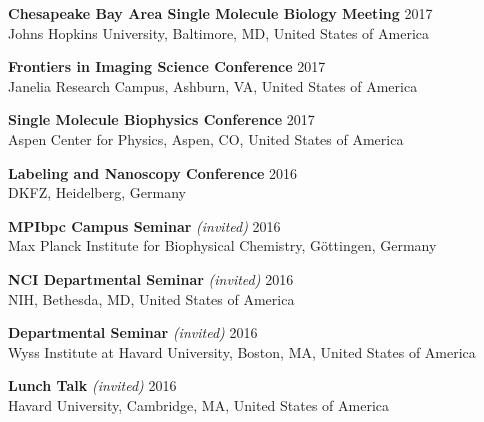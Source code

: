 \documentclass[margin,line]{res}
\begin{document}
\begin{resume}
\vspace*{-2.5mm}
{\bf Chesapeake Bay Area Single Molecule Biology Meeting} \hfill 2017\\
Johns Hopkins University, Baltimore, MD, United States of America%

\vspace*{-2.5mm}
{\bf Frontiers in Imaging Science Conference} \hfill 2017\\
Janelia Research Campus, Ashburn, VA, United States of America %

\vspace*{-2.5mm}
{\bf Single Molecule Biophysics Conference}  \hfill 2017\\
Aspen Center for Physics, Aspen, CO, United States of America

\vspace*{-2.5mm}
{\bf Labeling and Nanoscopy Conference} \hfill 2016\\
DKFZ, Heidelberg, Germany

\vspace*{-2.5mm}
{\bf MPIbpc Campus Seminar} {\it (invited)}  \hfill 2016\\
Max Planck Institute for Biophysical Chemistry, Göttingen, Germany

\vspace*{-2.5mm}
{\bf NCI Departmental Seminar} {\it (invited)}  \hfill 2016\\
NIH, Bethesda, MD, United States of America

\vspace*{-2.5mm}
{\bf Departmental Seminar} {\it (invited)} \hfill 2016\\
Wyss Institute at Havard University, Boston, MA, United States of America

\vspace*{-2.5mm}
{\bf Lunch Talk} {\it (invited)}  \hfill 2016\\
Havard University, Cambridge, MA, United States of America


\end{resume}
\end{document}
